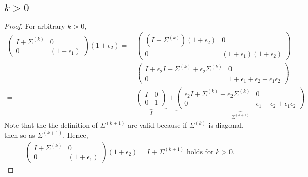 \documentclass[11pt,a4paper]{article}
\begin{document}
\subsection{$k > 0$}
\begin{proof}
    For arbitrary $k > 0$,
\begin{align}
     \left(\begin{array}{c|c} I+\Sigma^{(k)}&0\\\hline0&(1+\epsilon_1)\end{array}\right) (1+\epsilon_2)
    =\ & \left(\begin{array}{c|c}(I+\Sigma^{(k)}) (1+\epsilon_2)&0\\\hline0&(1+\epsilon_1)(1+\epsilon_2) \end{array}\right) \\
    =\ & \left(\begin{array}{c|c}
            I + \epsilon_2 I+ \Sigma^{(k)}+ \epsilon_2 \Sigma^{(k)} & 0\\\hline
            0 &  1+\epsilon_1+\epsilon_2+\epsilon_1\epsilon_2
        \end{array}\right) \\
    =\ & \underbrace{\left( \begin{array}{c|c}  I & 0 \\\hline 0 & 1
            \end{array} \right)}_{I}
    + \underbrace{ \left(\begin{array}{c|c}
            \epsilon_2 I+ \Sigma^{(k)}+ \epsilon_2 \Sigma^{(k)} & 0\\\hline
            0 &  \epsilon_1+\epsilon_2+\epsilon_1\epsilon_2
        \end{array}\right) }_{\Sigma^{(k+1)}}
        \end{align}
        Note that the the definition of $\Sigma^{(k+1)}$ are valid because if
        $\Sigma^{(k)}$ is diagonal, then so as $\Sigma^{(k+1)}$. 
        Hence,  
        \begin{align}
    \left(\begin{array}{c|c}
            I+\Sigma^{(k)}&0\\\hline0&(1+\epsilon_1)\end{array}\right)
    (1+\epsilon_2)=I+\Sigma^{(k+1)} \text{ holds for $k>0$. }
    \end{align}
    
\end{proof}

\setcounter{section}{22}
\end{document}
